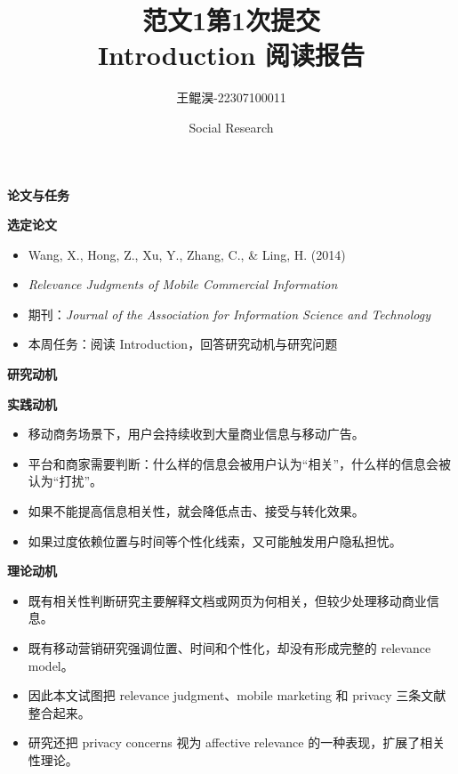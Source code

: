 \documentclass[aspectratio=169,UTF8,zihao=-4]{ctexbeamer}
\title{范文1第1次提交\\Introduction 阅读报告}
\author{王鲲淏-22307100011}
\date{Social Research}
\newcommand{\bigidea}[1]{
  \begin{center}
    \vspace{0.8em}
    {\LARGE \bfseries #1}
    \vspace{0.6em}
  \end{center}
}
\newcommand{\sectionpageframe}[1]{
  \begin{frame}[plain]
    \begin{center}
      \vfill
      {\Huge \bfseries #1}
      \vfill
    \end{center}
  \end{frame}
}
\begin{document}
\begin{frame}[plain]
  \titlepage
\end{frame}

\sectionpageframe{论文与任务}

\begin{frame}
  \bigidea{选定论文}
  \begin{itemize}
    \item \Large Wang, X., Hong, Z., Xu, Y., Zhang, C., \& Ling, H. (2014)
    \item \Large \textit{Relevance Judgments of Mobile Commercial Information}
    \item \Large 期刊：\textit{Journal of the Association for Information Science and Technology}
    \item \Large 本周任务：阅读 Introduction，回答研究动机与研究问题
  \end{itemize}
\end{frame}

\sectionpageframe{研究动机}

\begin{frame}
  \bigidea{实践动机}
  \begin{itemize}
    \item \Large 移动商务场景下，用户会持续收到大量商业信息与移动广告。
    \item \Large 平台和商家需要判断：什么样的信息会被用户认为“相关”，什么样的信息会被认为“打扰”。
    \item \Large 如果不能提高信息相关性，就会降低点击、接受与转化效果。
    \item \Large 如果过度依赖位置与时间等个性化线索，又可能触发用户隐私担忧。
  \end{itemize}
\end{frame}

\begin{frame}
  \bigidea{理论动机}
  \begin{itemize}
    \item \Large 既有相关性判断研究主要解释文档或网页为何相关，但较少处理移动商业信息。
    \item \Large 既有移动营销研究强调位置、时间和个性化，却没有形成完整的 relevance model。
    \item \Large 因此本文试图把 relevance judgment、mobile marketing 和 privacy 三条文献整合起来。
    \item \Large 研究还把 privacy concerns 视为 affective relevance 的一种表现，扩展了相关性理论。
  \end{itemize}
\end{frame}
\end{document}
